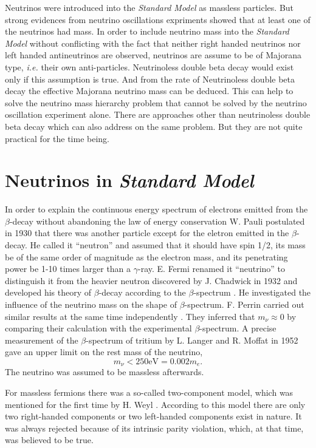 Neutrinos were introduced into the \emph{Standard Model} as massless
particles. But strong evidences from neutrino oscillations expriments
showed that at least one of the neutrinos had mass. In order to
include neutrino mass into the \emph{Standard Model} without
conflicting with the fact that neither right handed neutrinos nor left
handed antineutrinos are observed, neutrinos are assume to be of
Majorana type, \textit{i.e.} their own anti-particles. Neutrinoless
double beta decay would exist only if this assumption is true. And
from the rate of Neutrinoless double beta decay the effective Majorana
neutrino mass can be deduced. This can help to solve the neutrino mass
hierarchy problem that cannot be solved by the neutrino oscillation
experiment alone. There are approaches other than neutrinoless double
beta decay which can also address on the same problem. But they are
not quite practical for the time being.

\section{Neutrinos in \emph{Standard Model}}
\label{sec:sm}
In order to explain the continuous energy spectrum of electrons
emitted from the $\beta$-decay without abandoning the law of energy
conservation W. Pauli postulated in 1930 that there was another
particle except for the eletron emitted in the $\beta$-decay. He
called it ``neutron'' and assumed that it should have spin 1/2, its
mass be of the same order of magnitude as the electron mass, and its
penetrating power be 1-10 times larger than a $\gamma$-ray.
\cite{Pau30} E. Fermi renamed it ``neutrino'' to distinguish it from
the heavier neutron discovered by J. Chadwick in 1932 and developed
his theory of $\beta$-decay according to the $\beta$-spectrum
\cite{Fer33,Fer34}. He investigated the influence of the neutrino mass
on the shape of $\beta$-spectrum. F. Perrin carried out similar
results at the same time independently \cite{Per33}. They inferred
that $m_\nu \approx 0$ by comparing their calculation with the
experimental $\beta$-spectrum. A precise measurement of the
$\beta$-spectrum of tritium by L. Langer and R. Moffat in 1952
\cite{Lan52} gave an upper limit on the rest mass of the neutrino,
$$m_\nu < 250 \mbox{eV} = 0.002m_e.$$
The neutrino was assumed to be massless afterwards.

For massless fermions there was a so-called two-component model, which
was mentioned for the first time by H. Weyl \cite{Wey29}. According to
this model there are only two right-handed components or two
left-handed components exist in nature. It was always rejected because
of its intrinsic parity violation, which, at that time, was believed
to be true.

